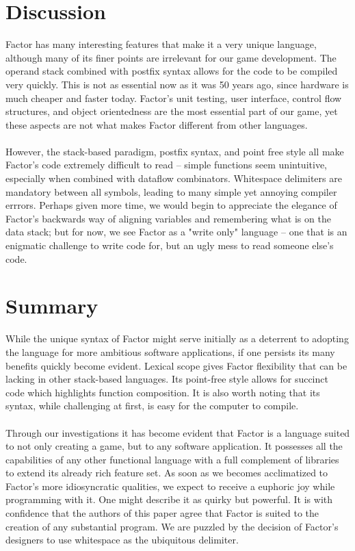 \documentclass{sig-alternate}
\begin{document}
\section{Discussion}
Factor has many interesting features that make it a very unique language, although many of its finer points are irrelevant for our game development. The operand stack combined with postfix syntax allows for the code to be compiled very quickly. This is not as essential now as it was 50 years ago, since hardware is much cheaper and faster today. Factor's unit testing, user interface, control flow structures, and object orientedness are the most essential part of our game, yet these aspects are not what makes Factor different from other languages.
\\\\
However, the stack-based paradigm, postfix syntax, and point free style all make Factor's code extremely difficult to read -- simple functions seem unintuitive, especially when combined with dataflow combinators. Whitespace delimiters are mandatory between all symbols, leading to many simple yet annoying compiler errrors. Perhaps given more time, we would begin to appreciate the elegance of Factor's backwards way of aligning variables and remembering what is on the data stack; but for now, we see Factor as a "write only" language -- one that is an enigmatic challenge to write code for, but an ugly mess to read someone else's code.

\section{Summary} 
While the unique syntax of Factor might serve initially as a deterrent to adopting the language for more ambitious software applications, if one persists its many benefits quickly become evident. Lexical scope gives Factor flexibility that can be lacking in other stack-based languages. Its point-free style allows for succinct code which highlights function composition. It is also worth noting that its syntax, while challenging at first, is easy for the computer to compile.
\\\\
Through our investigations it has become evident that Factor is a language suited to not only creating a game, but to any software application. It possesses all the capabilities of any other functional language with a full complement of libraries to extend its already rich feature set.\cite{FactorLibraries} As soon as we becomes acclimatized to Factor's more idiosyncratic qualities, we expect to receive a euphoric joy while programming with it. One might describe it as quirky but powerful. It is with confidence that the authors of this paper agree that Factor is suited to the creation of any substantial program. We are puzzled by the decision of Factor's designers to use whitespace as the ubiquitous delimiter. 
\\\\

 
 

\balancecolumns
\end{document}
